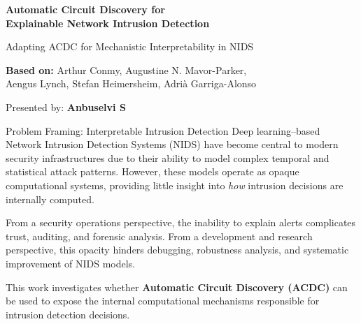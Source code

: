 \documentclass{beamer}
\begin{document}
	
	\begin{frame}
		\centering
		
		{\Large\bfseries Automatic Circuit Discovery for\\[4pt]
			Explainable Network Intrusion Detection}
		
		\vspace{14pt}
		
		{\normalsize
			Adapting ACDC for Mechanistic Interpretability in NIDS}
		
		\vspace{22pt}
		
		{\small
			\textbf{Based on:} Arthur Conmy, Augustine N. Mavor-Parker,\\
			Aengus Lynch, Stefan Heimersheim, Adri\`a Garriga-Alonso}
		
		\vfill
		
		{\small
			Presented by: \textbf{Anbuselvi S}}
	\end{frame}
	
	\begin{frame}{Problem Framing: Interpretable Intrusion Detection}
		\justifying
		Deep learning–based Network Intrusion Detection Systems (NIDS) have become
		central to modern security infrastructures due to their ability to model
		complex temporal and statistical attack patterns. However, these models operate
		as opaque computational systems, providing little insight into \emph{how}
		intrusion decisions are internally computed.
		
		\vspace{6pt}
		From a security operations perspective, the inability to explain alerts
		complicates trust, auditing, and forensic analysis. From a development and
		research perspective, this opacity hinders debugging, robustness analysis,
		and systematic improvement of NIDS models.
		
		\vspace{6pt}
		This work investigates whether \textbf{Automatic Circuit Discovery (ACDC)}
		can be used to expose the internal computational mechanisms responsible for
		intrusion detection decisions.
	\end{frame}
	
\end{document}
